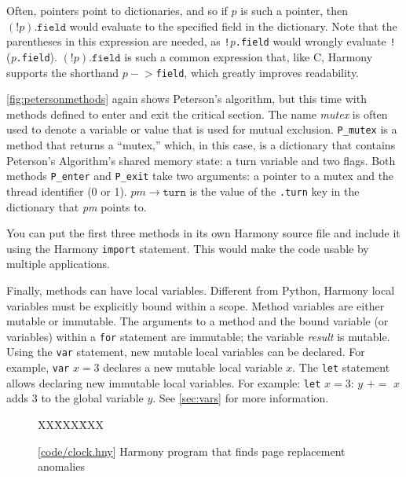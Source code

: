 \documentclass{report}
\newcommand{\harmonysource}[1]{
\begin{tabbing}
XX\=XXX\=XXX\kill
    
\end{tabbing}
}
\newcommand{\harmonylink}[1]{%
[\href{https://harmony.cs.cornell.edu/#1}{\underline{#1}}]%
}
\newenvironment{code}{
\tcolorbox
}{
\endtcolorbox
}
\begin{document}
Often, pointers point to dictionaries, and so if $p$ is such a pointer,
then $(!p).\mathtt{field}$ would evaluate to the specified field in the dictionary.
Note that the parentheses in this expression
are needed, as \texttt{!}\textit{p}\texttt{.field} would wrongly evaluate
\texttt{!}(\textit{p}\texttt{.field}).
$(!p).\mathtt{field}$ is such a common expression that, like C, Harmony supports the
shorthand $p-$$>$\texttt{field}, which greatly improves readability.

\autoref{fig:petersonmethods} again shows Peterson's algorithm,
but this time with methods defined to enter and exit the critical
section.
The name \textit{mutex} is often used to denote a variable or value
that is used for mutual exclusion.
\texttt{P\_mutex} is a method that returns a ``mutex,'' which, in this
case, is a dictionary that contains Peterson's Algorithm's shared memory state:
a turn variable and two flags.
Both methods \texttt{P\_enter} and \texttt{P\_exit} take two arguments:
a pointer to a mutex and the thread identifier (0 or 1).
$\mathit{pm}$$\rightarrow$$\mathtt{turn}$ is the value of the \texttt{.turn} key
in the dictionary that \textit{pm} points to. 

You can put the first three methods in its own Harmony source file
and include it using the Harmony \texttt{import} statement.
%
%
This would make the code usable by multiple applications.

Finally, methods can have local variables.
Different from Python, Harmony local variables must be
explicitly bound within a scope.
Method variables are either mutable or immutable.
The arguments to a method and the bound variable (or
variables) within a \texttt{for} statement are immutable;
the variable \textit{result} is mutable.
Using the \texttt{var} statement, new mutable local variables can be
declared.
For example, \texttt{var} $x = 3$ declares a new mutable local variable
$x$.
The \texttt{let} statement allows declaring new immutable local variables.
For example:
\texttt{let} $x = 3$: $y$ $+$$=$ $x$ adds 3 to the global variable
$y$.
See \autoref{sec:vars} for more information.

\begin{figure}
\begin{code}
\harmonysource{clock}
\end{code}
\caption{\harmonylink{code/clock.hny} Harmony program that finds page replacement anomalies}
\label{fig:clock}
\end{figure}
\end{document}
